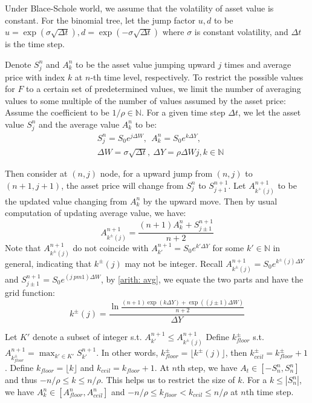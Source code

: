\documentclass[10pt, a4paper, twocolumn]{article} %
\begin{document}
Under Blace-Schole world, we assume that the volatility of asset value is constant. For the binomial tree, let the jump factor $ u, d $ to be $ u=\exp(\sigma\sqrt{\Delta t}), d=\exp(-\sigma\sqrt{\Delta t}) $ where $ \sigma $ is constant volatility, and $ \Delta t $ is the time step. 

Denote $ S^n_j $ and $ A^n_k $ to be the asset value jumping upward $ j $ times and average price with index $ k $ at $ n $-th time level, respectively. To restrict the possible values for $ F $ to a certain set of predetermined values, we limit the number of averaging values to some multiple of the number of values assumed by the asset price: Assume the coefficient to be $ 1 / \rho \in \mathbb{N} $. For a given time step $ \Delta t $, we let the asset value $ S^n_j $ and the average value $ A^n_k $ to be:
\begin{equation}
\begin{split}
&S^n_j= S_0 e^{j \Delta W}, \ \ A^n_k = S_0 e^{k \Delta Y}, \\ &\Delta W = \sigma\sqrt{\Delta t},\ \Delta Y = \rho\Delta W j, k \in\mathbb{N}
\end{split}
\end{equation}

Then consider at $ (n, j) $ node, for a upward jump from $ (n, j) $ to $ (n + 1, j + 1) $, the asset price will change from $ S^n_j $ to $ S^{n + 1}_{j + 1} $. Let $ A^{n + 1}_{k^+(j)} $ to be the updated value changing from $ A^n_k $ by the upward move. Then by usual computation of updating average value, we have:
\begin{equation}\label{arith: avg}
A^{n + 1}_{k^\pm(j)} = \frac{(n + 1) A^n_k + S^{n +1}_{j \pm 1}}{n + 2}
\end{equation}
Note that $ A^{n + 1}_{k^{\pm}(j)} $ do not coincide with $ A^{n + 1}_{k'} = S_0 e^{k' \Delta Y} $ for some $ k' \in \mathbb{N} $ in general, indicating that $ k^\pm(j) $ may not be integer. Recall $ A^{n + 1}_{k^{\pm}(j)} = S_0 e^{k^{\pm}(j) \Delta Y} $ and $ S^{n + 1}_{j \pm 1} = S_0 e^{(j \ pm 1) \Delta W} $, by \eqref{arith: avg}, we equate the two parts and have the grid function:
\begin{equation}\label{arith: grid func}
k^{\pm}(j) = \frac{\ln\frac{(n + 1) \exp(k \Delta Y) + \exp((j \pm 1) \Delta W)}{n + 2}}{\Delta Y}
\end{equation}

Let $ K' $ denote a subset of integer s.t. $ A^{n + 1}_{k'} \leq A^{n + 1}_{k^{\pm}(j)} $ Define $ k^{\pm}_{floor} $ s.t. $ A^{n + 1}_{k^{\pm}_{floor}} = \max_{k' \in K'} S^{n + 1}_{k'} $. In other words, $ k^{\pm}_{floor} = \lfloor k^{\pm}(j) \rfloor $, then $ k^\pm_{ceil} = k^\pm_{floor} + 1 $. Define $ k_{floor} = \lfloor k \rfloor $ and $ k_{ceil} = k_{floor} + 1 $. At $ n $th step, we have $ A_t \in [-S^n_n, S^n_n] $ and thus $ -n/\rho \leq k \leq n/\rho $. This helps us to restrict the size of $ k $. For a $ k \leq | S^n_n | $, we have $ A^n_k \in [A^n_{floor}, A^n_{ceil}] $ and $ -n/\rho \leq k_{floor} < k_{ceil} \leq n/\rho $ at $ n $th time step.
\end{document}
